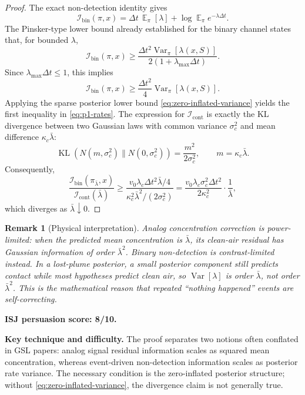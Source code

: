 \documentclass[11pt]{article}
\newtheorem{remark}[theorem]{Remark}
\DeclareMathOperator{\E}{\mathbb{E}}
\DeclareMathOperator{\Var}{\mathrm{Var}}
\DeclareMathOperator{\KL}{\mathrm{KL}}
\newcommand{\dt}{\Delta t}
\newcommand{\Ibin}{\mathcal{I}_{\mathrm{bin}}}
\newcommand{\Icont}{\mathcal{I}_{\mathrm{cont}}}
\begin{document}
\begin{proof}
The exact non-detection identity gives
\[
        \Ibin(\pi,x)
        =
        \dt\,\E_{\pi}[\lambda]
        +
        \log\E_{\pi}e^{-\lambda\dt}.
\]
The Pinsker-type lower bound already established for the binary channel states that, for bounded $\lambda$,
\[
        \Ibin(\pi,x)
        \geq
        \frac{\dt^2\Var_{\pi}[\lambda(x,S)]}{2(1+\lambda_{\max}\dt)}.
\]
Since $\lambda_{\max}\dt\leq 1$, this implies
\[
        \Ibin(\pi,x)
        \geq
        \frac{\dt^2}{4}\Var_{\pi}[\lambda(x,S)].
\]
Applying the sparse posterior lower bound \eqref{eq:zero-inflated-variance} yields the first inequality in \eqref{eq:p1-rates}.  The expression for $\Icont$ is exactly the KL divergence between two Gaussian laws with common variance $\sigma_c^2$ and mean difference $\kappa_c\bar{\lambda}$:
\[
        \KL(N(m,\sigma_c^2)\|N(0,\sigma_c^2))=\frac{m^2}{2\sigma_c^2},
        \qquad m=\kappa_c\bar{\lambda}.
\]
Consequently,
\[
        \frac{\Ibin(\pi_{\bar{\lambda}},x)}{\Icont(\bar{\lambda})}
        \geq
        \frac{v_0\lambda_c\dt^2\bar{\lambda}/4}
             {\kappa_c^2\bar{\lambda}^2/(2\sigma_c^2)}
        =
        \frac{v_0\lambda_c\sigma_c^2\dt^2}{2\kappa_c^2}
        \cdot
        \frac{1}{\bar{\lambda}},
\]
which diverges as $\bar{\lambda}\downarrow 0$.
\end{proof}

\begin{remark}[Physical interpretation]
Analog concentration correction is power-limited: when the predicted mean concentration is $\bar{\lambda}$, its clean-air residual has Gaussian information of order $\bar{\lambda}^2$.  Binary non-detection is contrast-limited instead.  In a lost-plume posterior, a small posterior component still predicts contact while most hypotheses predict clean air, so $\Var[\lambda]$ is order $\bar{\lambda}$, not order $\bar{\lambda}^2$.  This is the mathematical reason that repeated ``nothing happened'' events are self-correcting.
\end{remark}

\noindent\textbf{ISJ persuasion score: 8/10.}

\noindent\textbf{Key technique and difficulty.}
The proof separates two notions often conflated in GSL papers: analog signal residual information scales as squared mean concentration, whereas event-driven non-detection information scales as posterior rate variance.  The necessary condition is the zero-inflated posterior structure; without \eqref{eq:zero-inflated-variance}, the divergence claim is not generally true.
\end{document}
